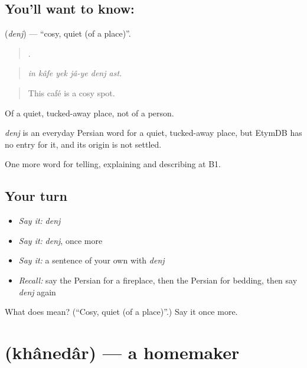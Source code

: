 \subsection*{You'll want to know: }
\textbf{} (\emph{denj}) — \textquotedblleft{}cosy, quiet (of a place)\textquotedblright{}.

\begin{quote}
     .
\end{quote}

\begin{quote}
\emph{in kâfe yek jâ-ye denj ast.}
\end{quote}

\begin{quote}
This café is a cosy spot.
\end{quote}

Of a quiet, tucked-away place, not of a person.

\begin{cousinweb}
\emph{denj} is an everyday Persian word for a quiet, tucked-away place, but EtymDB has no entry for it, and its origin is not settled.
\end{cousinweb}

\begin{grammarlens}[title={What you've built}]
One more word for telling, explaining and describing at B1.
\end{grammarlens}

\subsection*{Your turn}
\begin{itemize}
\raggedright
  \item \emph{Say it:} \emph{denj}
  \item \emph{Say it:} \emph{denj}, once more
  \item \emph{Say it:} a sentence of your own with \emph{denj}
  \item \emph{Recall:} say the Persian for a fireplace, then the Persian for bedding, then say \emph{denj} again
\end{itemize}

\begin{tcolorbox}[breakable,colback=teal!4,colframe=teal!35!black,title={Before you move on}]
What does  mean? (\textquotedblleft{}Cosy, quiet (of a place)\textquotedblright{}.) Say it once more.
\end{tcolorbox}
\section[\texorpdfstring{\fa{خانه} \fa{دار} (khânedâr)}{خانه دار (khânedâr)}]{  (khânedâr) — a homemaker}

